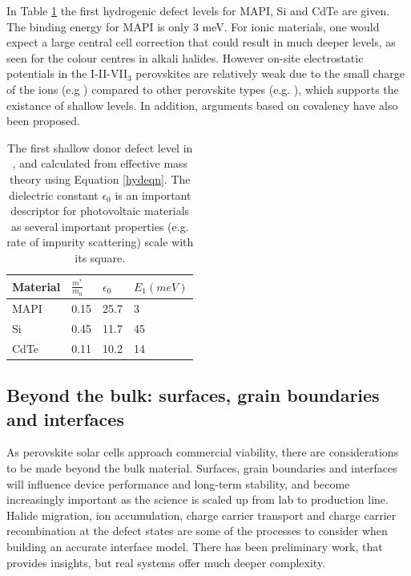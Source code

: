 In Table \ref{tab:defectlevels} the first hydrogenic defect levels for MAPI, Si and CdTe are given.
The binding energy for MAPI is only 3 meV.
For ionic materials, one would expect a large central cell correction that could result in much deeper levels, as seen for the colour centres in alkali halides.\autocite{Stoneham1975}
However on-site electrostatic potentials in the I-II-VII$_3$ perovskites are relatively weak due to the small charge of the ions (e.g ) compared to other perovskite types (e.g. ),\autocite{Brivio2014} which supports the existance of shallow levels. 
In addition, arguments based on covalency have also been proposed.\autocite{Brandt2015a}

\begin{table} \centering
\caption[Donor defect levels in , Si and CdTe]{\label{tab:defectlevels}The first shallow donor defect level in ,  and  calculated from effective mass theory using Equation \ref{hydeqn}. The dielectric constant $\epsilon_0$ is an important descriptor for photovoltaic materials as several important properties (e.g. rate of impurity scattering) scale with its square.}
\begin{tabular}{@{}llll@{}} \toprule   %
Material & $\frac{m^*}{m_0}$ & $\epsilon_0$ & $E_1 (meV)$ \\
\midrule
MAPI & 0.15\autocite{Frost2014b} & 25.7\autocite{Frost2014b} & 3 \\
Si & 0.45\autocite{Hava2007} & 11.7\autocite{Hava2007} &  45 \\
CdTe & 0.11\autocite{Wang2007} & 10.2\autocite{Madelung2003} & 14 \\
\bottomrule
\end{tabular}
\end{table}


\subsection{Beyond the bulk: surfaces, grain boundaries and interfaces}

As perovskite solar cells approach commercial viability,\autocite{Park2016} there are considerations to be made beyond the bulk material.
Surfaces, grain boundaries and interfaces will influence device performance and long-term stability, and become increasingly important as the science is scaled up from lab to production line. 
Halide migration, ion accumulation, charge carrier transport and charge carrier recombination at the defect states are some of the processes to consider when building an accurate interface model.
There has been preliminary work, that provides insights, but real systems offer much deeper complexity. 

